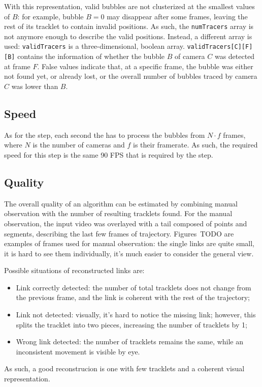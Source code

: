 With this representation, valid bubbles are not clusterized at the smallest values of $B$: for example, bubble $B{=}0$ may disappear after some frames, leaving the rest of its tracklet to contain invalid positions.
As such, the \texttt{numTracers} array is not anymore enough to describe the valid positions.
Instead, a different array is used: \texttt{validTracers} is a three-dimensional, boolean array.
\texttt{validTracers[C][F][B]} contains the information of whether the bubble $B$ of camera $C$ was detected at frame $F$.
False values indicate that, at a specific frame, the bubble was either not found yet, or already lost, or the overall number of bubbles traced by camera $C$ was lower than $B$.

\subsection{Speed}

As for the \locate* step, each second the \linkDD* has to process the bubbles from $N{\cdot}f$ frames, where $N$ is the number of cameras and $f$ is their framerate.
As such, the required speed for this step is the same 90 FPS that is required by the \locate* step.

\subsection{Quality}

The overall quality of an algorithm can be estimated by combining manual observation with the number of resulting tracklets found.
For the manual observation, the input video was overlayed with a tail composed of points and segments, describing the last few frames of trajectory.
Figures~TODO are examples of frames used for manual observation: the single links are quite small, it is hard to see them individually, it's much easier to consider the general view.

Possible situations of reconstructed links are:
\begin{itemize}
	\itemsep 0em
	\item Link correctly detected: the number of total tracklets does not change from the previous frame, and the link is coherent with the rest of the trajectory;
	\item Link not detected: visually, it's hard to notice the missing link; however, this splits the tracklet into two pieces, increasing the number of tracklets by 1;
	\item Wrong link detected: the number of tracklets remains the same, while an inconsistent movement is visible by eye.
\end{itemize}
As such, a good reconstrucion is one with few tracklets and a coherent visual representation.

